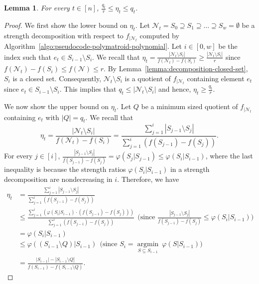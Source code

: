 \documentclass[11pt]{article}
\newtheorem{lemma}{Lemma}
\theoremstyle{definition}
\newcommand{\calN}{{\mathcal{N}}}
\begin{document}
\begin{lemma}\label{lemma:eta-approximation}
    For every $t\in [n]$, $\frac{q_t}{r}\leq \eta_t \leq q_t$.
\end{lemma}
\begin{proof}
    We first show the lower bound on $\eta_t$. Let $\calN_t=S_0\supseteq S_1\supseteq \ldots \supseteq S_w=\emptyset$ be a strength decomposition with respect to $f_{|\mathcal{N}_t}$ computed by Algorithm~\ref{algo:pseudocode-polymatroid-polynomial}. Let $i\in [0,w]$ be the index such that $e_t\in S_{i-1}\setminus S_i$. We recall that $\eta_t=\frac{|\mathcal{N}_t\setminus S_i|}{f(\mathcal{N}_t)-f(S_i)}\geq \frac{|\mathcal{N}_t\setminus S_i|}{r}$ since $f(\mathcal{N}_t)-f(S_i)\leq f(\mathcal{N})\leq r$. By Lemma~\ref{lemma:decomposition-closed-set}, $S_i$ is a closed set. Consequently, $\mathcal{N}_t\setminus S_i$ is a quotient of $f_{|\mathcal{N}_t}$ containing element $e_t$ since $e_t\in S_{i-1}\setminus S_i$. This implies that $q_t\leq |\mathcal{N}_t\setminus S_i|$ and hence, $\eta_t\geq \frac{q_t}{r}$.

    We now show the upper bound on $\eta_t$. Let $Q$ be a minimum sized quotient of $f_{|\mathcal{N}_t}$ containing $e_t$ with $|Q|=q_t$. We recall that
    $$\eta_t=\frac{|\mathcal{N}_t\setminus S_i|}{f(\mathcal{N}_t)-f(S_i)}=\frac{\sum_{j=1}^{i}|S_{j-1}\setminus S_j|}{\sum_{j=1}^{i}\left(f(S_{j-1})-f(S_j)\right)}.$$
    For every $j\in [i]$, $\frac{|S_{j-1}\setminus S_j|}{f(S_{j-1})-f(S_j)}=\varphi(S_j|S_{j-1})\leq \varphi(S_i|S_{i-1})$, where the last inequality is because the strength ratios $\varphi(S_i|S_{i-1})$ in a strength decomposition are nondecreasing in $i$. Therefore, we have
    $$\begin{aligned}
        \eta_t &= \frac{\sum_{j=1}^{i}|S_{j-1}\setminus S_j|}{\sum_{j=1}^{i}\left(f(S_{j-1})-f(S_j)\right)} \\
        &\leq \frac{\sum_{j=1}^{i}\left(\varphi(S_i|S_{i-1})\cdot (f(S_{j-1})-f(S_j))\right)}{\sum_{j=1}^{i}\left(f(S_{j-1})-f(S_j)\right)} \ \ \text{(since $\frac{|S_{j-1}\setminus S_j|}{f(S_{j-1})-f(S_j)}\leq \varphi(S_i|S_{i-1})$)} \\
        &= \varphi(S_i|S_{i-1}) \\
        &\leq \varphi(\left(S_{i-1}\setminus Q\right)|S_{i-1}) \ \ \text{(since $S_i=\mathop{argmin}\limits_{S\subseteq S_{i-1}} \ \varphi(S|S_{i-1})$)} \\
        &= \frac{|S_{i-1}|-|S_{i-1}\setminus Q|}{f(S_{i-1})-f(S_{i-1}\setminus Q)}.
    \end{aligned}$$


\end{proof}
\end{document}
